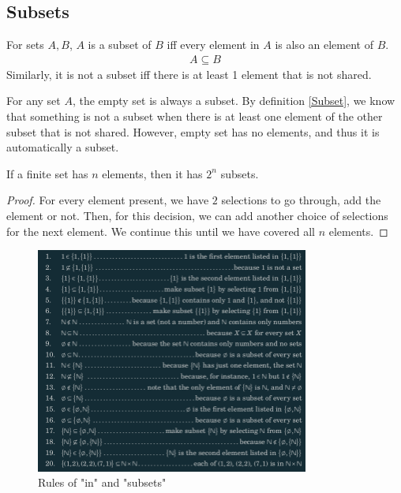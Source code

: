 \documentclass[a4paper]{article}
\theoremstyle{plain}
\newtheorem{thm}{Theorem}[section]
\theoremstyle{definition}
\newtheorem{defn}{Definition}[section]
\theoremstyle{remark}
\begin{document}
\subsection{Subsets}
\begin{tcolorbox}[colback=black!3!white,colframe=black!60!white,title=\begin{defn}Subset \label{Subset}\end{defn}]
For sets $A,B$, $A$ is a subset of $B$ iff every element in $A$ is also an element of $B$.
\begin{align}
	A \subseteq B
\end{align}
Similarly, it is not a subset iff there is at least 1 element that is not shared.
\end{tcolorbox}
\begin{tcolorbox}[colback=black!3!white,colframe=black!60!white,title=\begin{defn}$\varnothing \subseteq A$ \label{varnothing subseteq A}\end{defn}]
For any set $A$, the empty set is always a subset. By definition \ref{Subset}, we know that something is not a subset when there is at least one element of the other subset that is not shared. However, empty set has no elements, and thus it is automatically a subset. 
\end{tcolorbox}
\begin{tcolorbox}[colback=black!3!white,colframe=black!60!white,title=\begin{thm}$2^n$ Subsets \label{$2^n$ Subsets}\end{thm}]
If a finite set has $n$ elements, then it has $2^n$ subsets.
\begin{proof}
	For every element present, we have $2$ selections to go through, add the element or not. Then, for this decision, we can add another choice of selections for the next element. We continue this until we have covered all $n$ elements.
\end{proof}
\end{tcolorbox}

\begin{figure}[H]
	\centering
	\includegraphics[width=0.8\textwidth]{figures/subsets.png}
	\caption{Rules of "in" and "subsets"}
	\label{fig:figures-subsets-png}
\end{figure}
\end{document}
